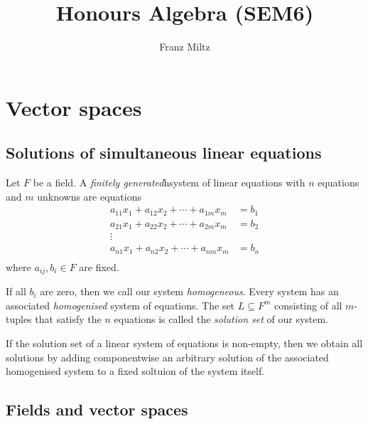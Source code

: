 \documentclass{article}
\begin{document}
\mkthmstwounified
\title{Honours Algebra (SEM6)}
\author{Franz Miltz}
\maketitle
\tableofcontents
\pagebreak

\section{Vector spaces}

\subsection{Solutions of simultaneous linear equations}

\begin{definition}
    Let $F$ be a field. A \emph{finitely generated}h{system of linear equations} with $n$ equations and
    $m$ unknowns are equations
    \begin{align*}
        a_{11}x_1 + a_{12}x_2 + \cdots + a_{1m}x_m & = b_1 \\
        a_{21}x_1 + a_{22}x_2 + \cdots + a_{2m}x_m & = b_2 \\
        \vdots                                             \\
        a_{n1}x_1 + a_{n2}x_2 + \cdots + a_{nm}x_m & = b_n \\
    \end{align*}
    where $a_{ij},b_i\in F$ are fixed.

    If all $b_i$ are zero, then we call our system \emph{homogeneous}. Every system
    has an associated \emph{homogenised} system of equations.
    The set $L\subseteq F^m$ consisting of all $m$-tuples that satisfy the
    $n$ equations is called the \emph{solution set} of our system.
\end{definition}

\begin{theorem}[Notes 1.1.4]
    If the solution set of a linear system of equations is non-empty, then we obtain
    all solutions by adding componentwise an arbitrary solution of the associated
    homogenised system to a fixed soltuion of the system itself.
\end{theorem}

\subsection{Fields and vector spaces}
\end{document}
